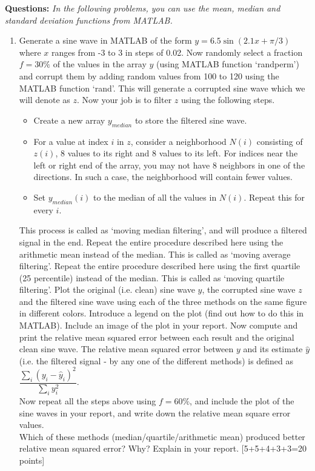 \documentclass[11pt]{article}
\begin{document}
\textbf{Questions:}
\textit{In the following problems, you can use the mean, median and standard deviation functions from MATLAB.}
\begin{enumerate}
\item Generate a sine wave in MATLAB of the form $y = 6.5 \sin (2.1x + \pi/3)$ where $x$ ranges from -3 to 3 in steps of 0.02. Now randomly select a fraction $f = 30\%$ of the values in the array $y$ (using MATLAB function `randperm') and corrupt them by adding random values from 100 to 120 using the MATLAB function `rand'. This will generate a corrupted sine wave which we will denote as $z$. Now your job is to filter $z$ using the following steps. 
\begin{itemize}
\item Create a new array $y_{median}$ to store the filtered sine wave.
\item For a value at index $i$ in $z$, consider a neighborhood $N(i)$ consisting of $z(i)$, 8 values to its right and 8 values to its left. For indices near the left or right end of the array, you may not have 8 neighbors in one of the directions. In such a case, the neighborhood will contain fewer values.
\item Set $y_{median}(i)$ to the median of all the values in $N(i)$. Repeat this for every $i$. 
\end{itemize}
This process is called as `moving median filtering', and will produce a filtered signal in the end. Repeat the entire procedure described here using the arithmetic mean instead of the median. This is called as `moving average filtering'. Repeat the entire procedure described here using the first quartile (25 percentile) instead of the median. This is called as `moving quartile filtering'. Plot the original (i.e. clean) sine wave $y$, the corrupted sine wave $z$ and the filtered sine wave using each of the three methods on the same figure in different colors. Introduce a legend on the plot (find out how to do this in MATLAB). Include an image of the plot in your report. Now compute and print the relative mean squared error between each result and the original clean sine wave. The relative mean squared error between $y$ and its estimate $\hat{y}$ (i.e. the filtered signal - by any one of the different methods) is defined as $\dfrac{\sum_i (y_i-\hat{y}_i)^2}{\sum_i y^2_i}$. \\
Now repeat all the steps above using $f = 60\%$, and include the plot of the sine waves in your report, and write down the relative mean square error values. \\
Which of these methods (median/quartile/arithmetic mean) produced better relative mean squared error? Why? Explain in your report. \textsf{[5+5+4+3+3=20 points]}


\end{enumerate}
\end{document}
